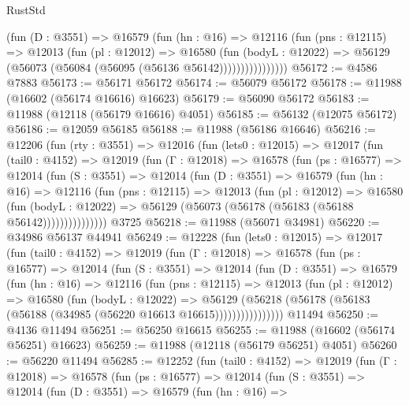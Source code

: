\begin{lexlean}{RustStd}
\begin{coremodule}
                  (fun (D : @3551) =>
                  @16579
                    (fun (hn : @16) =>
                    @12116
                      (fun (pns : @12115) =>
                      @12013
                        (fun (pl : @12012) =>
                        @16580
                          (fun (bodyL : @12022) =>
                          @56129 (@56073 (@56084 (@56095 (@56136 @56142))))))))))))))))
@56172 := @4586 @7883
@56173 := @56171 @56172
@56174 := @56079 @56172
@56178 := @11988 (@16602 (@56174 @16616) @16623)
@56179 := @56090 @56172
@56183 := @11988 (@12118 (@56179 @16616) @4051)
@56185 := @56132 (@12075 @56172)
@56186 := @12059 @56185
@56188 := @11988 (@56186 @16646)
@56216 := @12206
    (fun (rty : @3551) =>
    @12016
      (fun (lets0 : @12015) =>
      @12017
        (fun (tail0 : @4152) =>
        @12019
          (fun (Γ : @12018) =>
          @16578
            (fun (ps : @16577) =>
            @12014
              (fun (S : @3551) =>
              @12014
                (fun (D : @3551) =>
                @16579
                  (fun (hn : @16) =>
                  @12116
                    (fun (pns : @12115) =>
                    @12013
                      (fun (pl : @12012) =>
                      @16580
                        (fun (bodyL : @12022) =>
                        @56129 (@56073 (@56178 (@56183 (@56188 @56142)))))))))))))))
    @3725
@56218 := @11988 (@56071 @34981)
@56220 := @34986 @56137 @44941
@56249 := @12228
    (fun (lets0 : @12015) =>
    @12017
      (fun (tail0 : @4152) =>
      @12019
        (fun (Γ : @12018) =>
        @16578
          (fun (ps : @16577) =>
          @12014
            (fun (S : @3551) =>
            @12014
              (fun (D : @3551) =>
              @16579
                (fun (hn : @16) =>
                @12116
                  (fun (pns : @12115) =>
                  @12013
                    (fun (pl : @12012) =>
                    @16580
                      (fun (bodyL : @12022) =>
                      @56129
                        (@56218
                          (@56178 (@56183 (@56188 (@34985 (@56220 @16613 @16615))))))))))))))))
    @11494
@56250 := @4136 @11494
@56251 := @56250 @16615
@56255 := @11988 (@16602 (@56174 @56251) @16623)
@56259 := @11988 (@12118 (@56179 @56251) @4051)
@56260 := @56220 @11494
@56285 := @12252
    (fun (tail0 : @4152) =>
    @12019
      (fun (Γ : @12018) =>
      @16578
        (fun (ps : @16577) =>
        @12014
          (fun (S : @3551) =>
          @12014
            (fun (D : @3551) =>
            @16579
              (fun (hn : @16) =>

\end{coremodule}
\end{lexlean}
